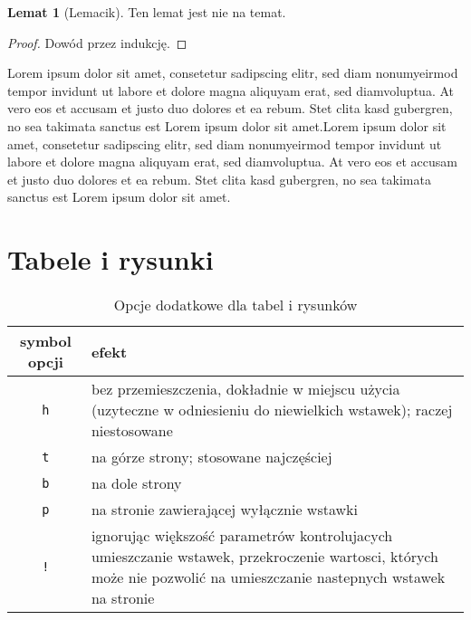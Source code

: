\documentclass[a4paper,11pt,twoside]{report}
\theoremstyle{definition}
\newtheorem{lemma}[theorem]{Lemat}
\begin{document}
\begin{lemma}[Lemacik]
  Ten lemat jest nie na temat.
\end{lemma}
\begin{proof} Dowód przez indukcję.
\end{proof}


Lorem ipsum dolor sit amet, consetetur sadipscing elitr, sed diam nonumyeirmod tempor invidunt ut labore et dolore magna aliquyam erat, sed diamvoluptua. At vero eos et accusam et justo duo dolores et ea rebum. Stet clita kasd gubergren, no sea takimata sanctus est Lorem ipsum dolor sit amet.Lorem ipsum dolor sit amet, consetetur sadipscing elitr, sed diam nonumyeirmod tempor invidunt ut labore et dolore magna aliquyam erat, sed diamvoluptua. At vero eos et accusam et justo duo dolores et ea rebum. Stet clita kasd gubergren, no sea takimata sanctus est Lorem ipsum dolor sit amet.



\section{Tabele i rysunki}

\begin{table}%
  \caption[Opis skrócony]{Opcje dodatkowe dla tabel i rysunków}
  \label{opcje}
  \centering
  \begin{tabular}{|c|p{}|}
    \hline
    symbol opcji & efekt                                                                                                                                                               \\ \hline
    \texttt{h}   & bez przemieszczenia, dokładnie w miejscu użycia (uzyteczne w odniesieniu do niewielkich wstawek); raczej niestosowane                                               \\
    \texttt{t}   & na górze strony; stosowane najczęściej                                                                                                                              \\
    \texttt{b}   & na dole strony                                                                                                                                                      \\
    \texttt{p}   & na stronie zawierającej wyłącznie wstawki                                                                                                                           \\
    \texttt{!}   & ignorując większość parametrów kontrolujacych umieszczanie wstawek, przekroczenie wartosci, których może nie pozwolić na umieszczanie nastepnych wstawek na stronie \\ \hline
  \end{tabular}
\end{table}
\end{document}
